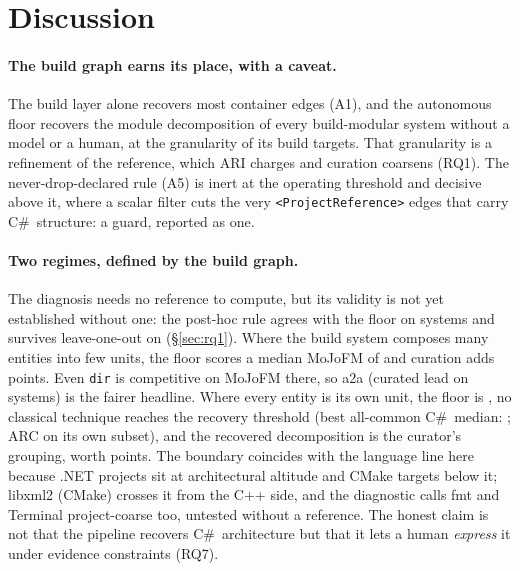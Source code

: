 \section{Discussion}
\label{sec:discussion}


\paragraph{The build graph earns its place, with a caveat.} The build layer alone recovers most
container edges (A1), and the autonomous floor recovers the module decomposition of every
build-modular system without a model or a human, at the granularity of its build targets. That
granularity is a refinement of the reference, which ARI charges and curation coarsens (RQ1). The
never-drop-declared rule (A5) is inert at the operating threshold and decisive above it, where a
scalar filter cuts the very \texttt{<ProjectReference>} edges that carry C\#\ structure: a
guard, reported as one.

\paragraph{Two regimes, defined by the build graph.} The diagnosis needs no reference to compute,
but its validity is not yet established without one: the post-hoc rule agrees with the floor on
\rqAdequacyRuleAgreement{} systems and survives leave-one-out on \rqAdequacyLooCorrect{}
(\S\ref{sec:rq1}). Where the build system composes
many entities into few units, the floor scores a median MoJoFM of \rqOneFloorAdequateMoJo{} and
curation adds \rqThreeCurationLiftCpp{} points. Even \texttt{dir} is competitive on MoJoFM there,
so a2a (curated lead on \rqTwoPipelineAtoAWins{} systems) is the fairer headline. Where every
entity is its own unit, the floor is \rqOneFloorCsMoJo{}, no classical technique reaches the
recovery threshold (best all-common C\#\ median: \rqTwoCsBestAllCommonName{}
\rqTwoCsBestAllCommonMoJo{}; ARC \rqTwoArcCsMoJo{} on its own subset), and the recovered
decomposition is the curator's grouping, worth \rqThreeCurationLiftCs{} points. The boundary
coincides with the language line here because .NET projects sit at architectural altitude and
CMake targets below it; libxml2 (CMake) crosses it from the C++ side, and the diagnostic
calls fmt and Terminal project-coarse too, untested without a reference. The honest claim is not that the pipeline recovers C\#\
architecture but that it lets a human \emph{express} it under evidence constraints (RQ7).

